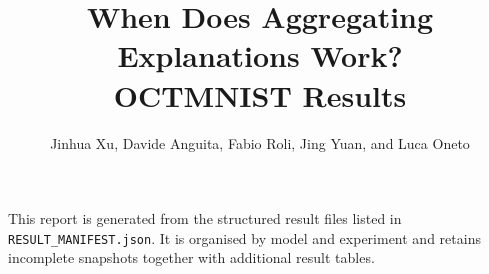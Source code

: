 \documentclass[10pt,a4paper]{article}
\title{When Does Aggregating Explanations Work?\\\large OCTMNIST Results}
\author{Jinhua Xu, Davide Anguita, Fabio Roli, Jing Yuan, and Luca Oneto}
\date{}
\begin{document}
\maketitle

\noindent
This report is generated from the structured result files listed in
\texttt{RESULT\_MANIFEST.json}. It is organised by model and experiment
and retains incomplete snapshots together with additional result tables.


\end{document}
